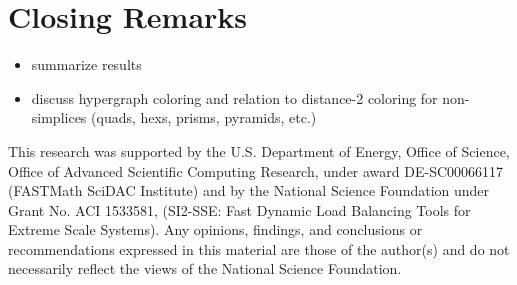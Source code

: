 \documentclass[graybox]{svmult}
\begin{document}
\section{Closing Remarks} \label{sec:closing}
\begin{itemize}
  \item summarize results
  \item discuss hypergraph coloring and relation to distance-2 coloring for non-simplices (quads, hexs, prisms, pyramids, etc.)
\end{itemize}

\begin{acknowledgement}
This research was supported by the U.S. Department of Energy, Office of Science,
Office of Advanced Scientific Computing Research, under award DE-SC00066117
(FASTMath SciDAC Institute) and by the National Science Foundation under Grant
No. ACI 1533581, (SI2-SSE: Fast Dynamic Load Balancing Tools for Extreme Scale
Systems).
Any opinions, findings, and conclusions or recommendations expressed in this
material are those of the author(s) and do not necessarily reflect the views
of the National Science Foundation.
\end{acknowledgement}



\end{document}
